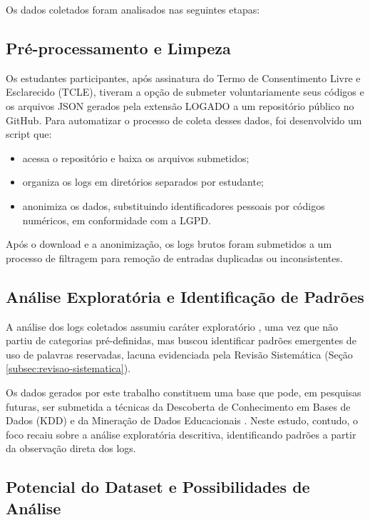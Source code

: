 Os dados coletados foram analisados nas seguintes etapas:

\subsection{Pré-processamento e Limpeza}\label{subsec:limpeza}

Os estudantes participantes, após assinatura do Termo de Consentimento Livre e Esclarecido (TCLE), tiveram a opção de submeter voluntariamente seus códigos e os arquivos JSON gerados pela extensão LOGADO a um repositório público no GitHub. Para automatizar o processo de coleta desses dados, foi desenvolvido um script que:
\begin{itemize}
    \item acessa o repositório e baixa os arquivos submetidos;
    \item organiza os logs em diretórios separados por estudante;
    \item anonimiza os dados, substituindo identificadores pessoais por códigos numéricos, em conformidade com a LGPD.
\end{itemize}

Após o download e a anonimização, os logs brutos foram submetidos a um processo de filtragem para remoção de entradas duplicadas ou inconsistentes.

\subsection{Análise Exploratória e Identificação de Padrões}
\label{subsec:identificacoes-padroes}

A análise dos logs coletados assumiu caráter exploratório \cite{gil2018metodos}, uma vez que não partiu de categorias pré-definidas, mas buscou identificar padrões emergentes de uso de palavras reservadas, lacuna evidenciada pela Revisão Sistemática (Seção \ref{subsec:revisao-sistematica}).

Os dados gerados por este trabalho constituem uma base que pode, em pesquisas futuras, ser submetida a técnicas da Descoberta de Conhecimento em Bases de Dados (KDD) \cite{fayyad1996knowledge} e da Mineração de Dados Educacionais \cite{baker2009state}. Neste estudo, contudo, o foco recaiu sobre a análise exploratória descritiva, identificando padrões a partir da observação direta dos logs.

\subsection{Potencial do Dataset e Possibilidades de Análise}
\label{subsec:potencial-possibilidades}

